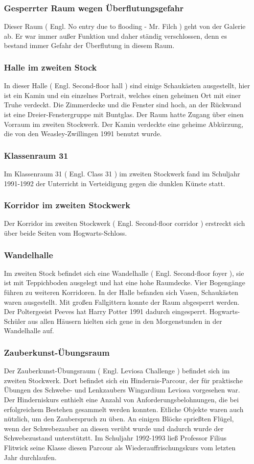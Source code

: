 \documentclass[a4paper, 10pt]{article}
\begin{document}
\subsubsection*{\large Gesperrter Raum wegen Überflutungsgefahr}
Dieser Raum (  Engl.  No entry due to flooding - Mr. Filch ) geht von der Galerie ab. Er war immer außer Funktion und daher ständig verschlossen, denn es bestand immer Gefahr der Überflutung in diesem Raum.
\subsubsection*{\large Halle im zweiten Stock}
In dieser Halle (  Engl.  Second-floor hall ) sind einige Schaukästen ausgestellt, hier ist ein Kamin und ein einzelnes Portrait, welches einen geheimen Ort mit einer Truhe verdeckt. Die Zimmerdecke und die Fenster sind hoch, an der Rückwand ist eine Dreier-Fenstergruppe mit Buntglas. Der Raum hatte Zugang über einen Vorraum im zweiten Stockwerk. Der Kamin verdeckte eine geheime Abkürzung, die von den Weasley-Zwillingen 1991 benutzt wurde.
\subsubsection*{\large Klassenraum 31}
Im Klassenraum 31 (  Engl.  Class 31 ) im zweiten Stockwerk fand im Schuljahr 1991-1992 der Unterricht in Verteidigung gegen die dunklen Künste statt.
\subsubsection*{\large Korridor im zweiten Stockwerk}
Der Korridor im zweiten Stockwerk (  Engl.  Second-floor corridor ) erstreckt sich über beide Seiten vom Hogwarts-Schloss.
\subsubsection*{\large Wandelhalle}
Im zweiten Stock befindet sich eine Wandelhalle (  Engl.  Second-floor foyer ), sie ist mit Teppichboden ausgelegt und hat eine hohe Raumdecke. Vier Bogengänge führen zu weiteren Korridoren. In der Halle befanden sich Vasen, Schaukästen waren ausgestellt. Mit großen Fallgittern konnte der Raum abgesperrt werden. Der Poltergeeist Peeves hat Harry Potter 1991 dadurch eingesperrt. Hogwarts-Schüler aus allen Häusern hielten sich gene in den Morgenstunden in der Wandelhalle auf.
\subsubsection*{\large Zauberkunst-Übungsraum}
Der Zauberkunst-Übungsraum (  Engl.  Leviosa Challenge ) befindet sich im zweiten Stockwerk. Dort befindet sich ein Hindernis-Parcour, der für praktische Übungen des Schwebe- und Lenkzaubers Wingardium Leviosa vorgesehen war. Der Hinderniskurs enthielt eine Anzahl von Anforderungsbelohnungen, die bei erfolgreichem Bestehen gesammelt werden konnten. Etliche Objekte waren auch nützlich, um den Zauberspruch zu üben. An einigen Blöcke sprießten Flügel, wenn der Schwebezauber an diesen verübt wurde und dadurch wurde der Schwebezustand unterstütztt. Im Schuljahr 1992-1993 ließ Professor Filius Flitwick seine Klasse diesen Parcour als Wiederauffrischungskurs vom letzten Jahr durchlaufen.
\end{document}
